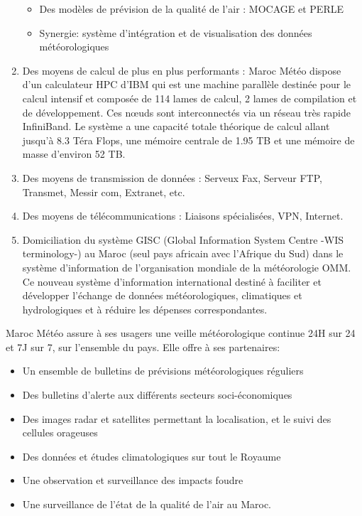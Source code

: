 \begin{enumerate}
\begin{itemize}
\begin{itemize}
     \end{itemize}
     \item[\ding{224}] Des modèles de prévision de la qualité de l'air : MOCAGE et PERLE
     \item[\ding{224}] Synergie: système d'intégration et de visualisation des données météorologiques
    \end{itemize}    
\item Des moyens de calcul de plus en plus performants : Maroc Météo dispose d'un calculateur HPC d'IBM qui est une machine parallèle destinée pour le calcul intensif et composée de 114 lames de calcul, 2 lames de compilation et de développement. Ces nœuds sont interconnectés via un réseau très rapide InfiniBand. Le système a une capacité totale théorique de calcul allant jusqu’à 8.3 Téra Flops, une mémoire centrale de 1.95 TB et une mémoire de masse d’environ 52 TB.
\item Des moyens de transmission de données : Serveux Fax, Serveur FTP, Transmet, Messir com, Extranet, etc.
\item Des moyens de télécommunications :  Liaisons spécialisées, VPN, Internet.
\item Domiciliation du système GISC (Global Information System Centre -WIS terminology-) au Maroc (seul pays africain avec l’Afrique du Sud) dans le système d’information de l’organisation mondiale de la météorologie OMM. Ce nouveau système d’information international destiné à faciliter et développer l’échange de données météorologiques, climatiques et hydrologiques et
à réduire les dépenses correspondantes.\\
\end{enumerate}

Maroc Météo assure à ses usagers une veille météorologique continue 24H sur 24 et 7J sur 7, sur l'ensemble du pays. Elle offre à ses partenaires:

\begin{itemize}
\item[\ding{74}] Un ensemble de bulletins de prévisions météorologiques réguliers
\item[\ding{74}] Des bulletins d'alerte aux différents secteurs soci-économiques
\item[\ding{74}] Des images radar et satellites permettant la localisation, et le suivi des cellules orageuses
\item[\ding{74}] Des données et études climatologiques sur tout le Royaume
\item[\ding{74}] Une observation et surveillance des impacts foudre
\item[\ding{74}] Une surveillance de l'état de la qualité de l'air au Maroc.\\
\end{itemize}

